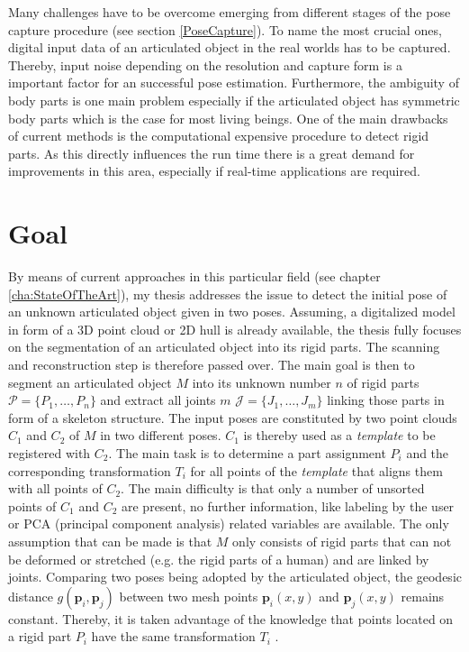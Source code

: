 Many challenges have to be overcome emerging from different stages of the pose capture procedure (see section \ref{PoseCapture}). To name the most crucial ones, digital input data of an articulated object in the real worlds has to be captured. Thereby, input noise depending on the resolution and capture form is a important factor for an successful pose estimation. Furthermore, the ambiguity of body parts is one main problem especially if the articulated object has symmetric body parts which is the case for most living beings. One of the main drawbacks of current methods is the computational expensive procedure to detect rigid parts. As this directly influences the run time there is a great demand for improvements in this area, especially if real-time applications are required.

\section{Goal}

By means of current approaches in this particular field (see chapter \ref{cha:StateOfTheArt}), my thesis addresses the issue to detect the initial pose of an unknown articulated object given in two poses. Assuming, a digitalized model in form of a 3D point cloud or 2D hull is already available, the thesis fully focuses on the segmentation of an articulated object into its rigid parts. The scanning and reconstruction step is therefore passed over. The main goal is then to segment an articulated object $M$ into its unknown number $n$ of rigid parts $\mathcal{P} =  \{P_1,\ldots,P_n\}$ and extract all joints $m$ $\mathcal{J} =  \{J_1,\ldots,J_m\}$ linking those parts in form of a skeleton structure. The input poses are constituted by two point clouds $C_1$ and $C_2$ of $M$ in two different poses. $C_1$ is thereby used as a \textit{template} to be registered with $C_2$. The main task is to determine a part assignment $P_i$ and the corresponding transformation $T_i$ for all points of the \textit{template} that aligns them with all points of $C_2$. The main difficulty is that only a number of unsorted points of $C_1$ and $C_2$ are present, no further information, like labeling by the user or PCA (principal component analysis) related variables are available. The only assumption that can be made is that $M$ only consists of rigid parts that can not be deformed or stretched (e.g. the rigid parts of a human) and are linked by joints. Comparing two poses being adopted by the articulated object, the geodesic distance $g(\boldsymbol{p}_i,\boldsymbol{p}_j)$ between two mesh points $\boldsymbol{p}_i(x,y)$ and $\boldsymbol{p}_j(x,y)$ remains constant. Thereby, it is taken advantage of the knowledge that points located on a rigid part $P_i$ have the same transformation $T_i$ .

